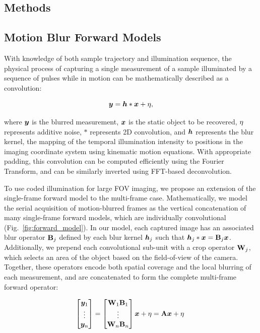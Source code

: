\subsection{Methods}
\subsection{Motion Blur Forward Models}
With knowledge of both sample trajectory and illumination sequence, the physical process of capturing a single measurement of a sample illuminated by a sequence of pulses while in motion can be mathematically described as a convolution:

\begin{equation}
\label{eq:single_forward}
\bm{y} = \bm{h} * \bm{x} + {\eta},
\end{equation}

\noindent where $\bm{y}$ is the blurred measurement, $\bm{x}$ is the static object to be recovered, ${\eta}$ represents additive noise, $*$ represents 2D convolution, and $\bm{h}$ represents the blur kernel, the mapping of the temporal illumination intensity to positions in the imaging coordinate system using kinematic motion equations. With appropriate padding, this convolution can be computed efficiently using the Fourier Transform, and can be similarly inverted using FFT-based deconvolution.

To use coded illumination for large FOV imaging, we propose an extension of the single-frame forward model to the multi-frame case. 
Mathematically, we model the serial acquisition of motion-blurred frames as the vertical concatenation of many single-frame forward models, which are individually convolutional (Fig.~\ref{fig:forward_model}). 
In our model, each captured image has an associated blur operator $\mathbf{B}_j$ defined by each blur kernel $\bm{h}_j$ such that $\bm{h}_j * \bm{x} = \mathbf{B}_j \bm{x}$.
Additionally, we prepend each convolutional sub-unit with a crop operator $\mathbf{W}_j$, which selects an area of the object based on the field-of-view of the camera. Together, these operators encode both spatial coverage and the local blurring of each measurement, and are concatenated to form the complete multi-frame forward operator:

\begin{equation}
\label{eq:multiframe_forward}
\begin{bmatrix}\bm{y}_1\\ \vdots \\ \bm{y}_n \end{bmatrix} = \begin{bmatrix}\mathbf{W}_1\mathbf{B}_1 \\ \vdots \\ \mathbf{W}_n \mathbf{B}_n \end{bmatrix} \bm{x} + {\eta} = \mathbf{A}\bm{x} + {\eta}\:
\end{equation}

